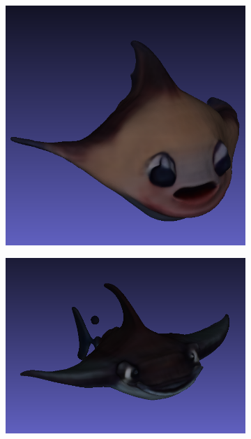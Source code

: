 \begin{figure}[H]
\begin{subfigure}[b]{0.1825\textwidth}
        \includegraphics[width=\textwidth]{figures/future/manta_coarse_3.png}
        \caption{}
    \end{subfigure}
    \begin{subfigure}[b]{0.25\textwidth}
        \centering
        \includegraphics[width=\textwidth]{figures/future/manta_coarse_4.png}
        \caption{}
    \end{subfigure}


\end{figure}
